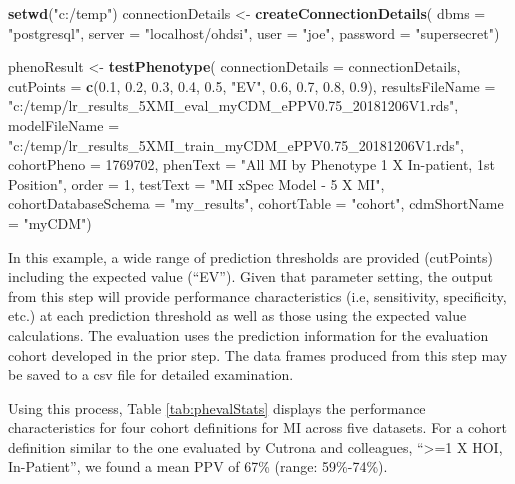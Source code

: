 \documentclass[11pt]{book}
\newenvironment{Shaded}{\begin{snugshade}}{\end{snugshade}}
\newcommand{\KeywordTok}[1]{\textcolor[rgb]{0.13,0.29,0.53}{\textbf{#1}}}
\newcommand{\DataTypeTok}[1]{\textcolor[rgb]{0.13,0.29,0.53}{#1}}
\newcommand{\DecValTok}[1]{\textcolor[rgb]{0.00,0.00,0.81}{#1}}
\newcommand{\FloatTok}[1]{\textcolor[rgb]{0.00,0.00,0.81}{#1}}
\newcommand{\StringTok}[1]{\textcolor[rgb]{0.31,0.60,0.02}{#1}}
\newcommand{\NormalTok}[1]{#1}
\theoremstyle{definition}
\theoremstyle{definition}
\theoremstyle{definition}
\theoremstyle{remark}
\begin{document}
\begin{Shaded}
\begin{Highlighting}[]
\KeywordTok{setwd}\NormalTok{(}\StringTok{"c:/temp"}\NormalTok{)}
\NormalTok{connectionDetails <-}\StringTok{ }\KeywordTok{createConnectionDetails}\NormalTok{(}
  \DataTypeTok{dbms =} \StringTok{"postgresql"}\NormalTok{,}
  \DataTypeTok{server =} \StringTok{"localhost/ohdsi"}\NormalTok{,}
  \DataTypeTok{user =} \StringTok{"joe"}\NormalTok{,}
  \DataTypeTok{password =} \StringTok{"supersecret"}\NormalTok{)}

\NormalTok{phenoResult <-}\StringTok{ }\KeywordTok{testPhenotype}\NormalTok{(}
  \DataTypeTok{connectionDetails =}\NormalTok{ connectionDetails,}
  \DataTypeTok{cutPoints =} \KeywordTok{c}\NormalTok{(}\FloatTok{0.1}\NormalTok{, }\FloatTok{0.2}\NormalTok{, }\FloatTok{0.3}\NormalTok{, }\FloatTok{0.4}\NormalTok{, }\FloatTok{0.5}\NormalTok{, }\StringTok{"EV"}\NormalTok{, }\FloatTok{0.6}\NormalTok{, }\FloatTok{0.7}\NormalTok{, }\FloatTok{0.8}\NormalTok{, }\FloatTok{0.9}\NormalTok{),}
  \DataTypeTok{resultsFileName =} 
    \StringTok{"c:/temp/lr_results_5XMI_eval_myCDM_ePPV0.75_20181206V1.rds"}\NormalTok{,}
  \DataTypeTok{modelFileName =} 
    \StringTok{"c:/temp/lr_results_5XMI_train_myCDM_ePPV0.75_20181206V1.rds"}\NormalTok{,}
  \DataTypeTok{cohortPheno =} \DecValTok{1769702}\NormalTok{,}
  \DataTypeTok{phenText =} \StringTok{"All MI by Phenotype 1 X In-patient, 1st Position"}\NormalTok{,}
  \DataTypeTok{order =} \DecValTok{1}\NormalTok{,}
  \DataTypeTok{testText =} \StringTok{"MI xSpec Model - 5 X MI"}\NormalTok{,}
  \DataTypeTok{cohortDatabaseSchema =} \StringTok{"my_results"}\NormalTok{,}
  \DataTypeTok{cohortTable =} \StringTok{"cohort"}\NormalTok{,}
  \DataTypeTok{cdmShortName =} \StringTok{"myCDM"}\NormalTok{)}
\end{Highlighting}
\end{Shaded}

In this example, a wide range of prediction thresholds are provided
(cutPoints) including the expected value (``EV''). Given that parameter
setting, the output from this step will provide performance
characteristics (i.e, sensitivity, specificity, etc.) at each prediction
threshold as well as those using the expected value calculations. The
evaluation uses the prediction information for the evaluation cohort
developed in the prior step. The data frames produced from this step may
be saved to a csv file for detailed examination.

Using this process, Table \ref{tab:phevalStats} displays the performance
characteristics for four cohort definitions for MI across five datasets.
For a cohort definition similar to the one evaluated by Cutrona and
colleagues, ``\textgreater{}=1 X HOI, In-Patient'', we found a mean PPV
of 67\% (range: 59\%-74\%).
\end{document}
